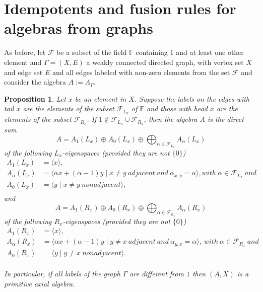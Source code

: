 \documentclass[oneside,a4paper]{amsart} %
\newtheorem{proposition}{Proposition}[section]
\theoremstyle{definition}
\begin{document}



\section{Idempotents and fusion rules for algebras from graphs}
\label{section:axial}

As before, let $\mathcal{F}$ be a subset of the field $\mathbb{F}$ containing  $1$ and at least one other element 
and $\Gamma=(X,E)$  a weakly connected directed graph, with vertex set $X$ and edge set $E$ and all edges  labeled
with non-zero elements from the set $\mathcal{F}$ and consider the algebra  $A:=A_{\Gamma}$.



\begin{proposition}\label{axialprop}
Let $x$ be an element in $X$. Suppose the labels on  the edges with tail  $x$ are the elements of the subset $\mathcal{F}_{L_a}$
of $\mathbb{F}$  and those with head $x$ are the elements of the subset $\mathcal{F}_{R_x}$. 
If $1\not \in \mathcal{F}_{L_a}\cup \mathcal{F}_{R_a}$, then the algebra $A$ is the direct sum 
$$A=A_1(L_x)\oplus A_0(L_x)\oplus \bigoplus_{\alpha\in \mathcal{F}_{L_x}} A_{\alpha}(L_x)$$ of the following   $L_x$-eigenspaces (provided they are not $\{0\}$)
$$
\begin{array}{ll}
A_{1}(L_x)&=\langle x\rangle,\\
A_{\alpha}(L_x)&=\langle \alpha x+ (\alpha-1)y\mid x\neq y\ \mathit{adjacent}\ \mathit{and}\ \alpha_{x,y}=\alpha\rangle, \mathit{with}\ \alpha\in \mathcal{F}_{L_x}\  \mathit{and}\\
A_{0}(L_x)&=\langle y\mid x\neq y\ \mathit{nonadjacent}\rangle,\\

\end{array}$$
and $$A=A_1(R_x)\oplus A_0(R_x)\oplus \bigoplus_{\alpha\in \mathcal{F}_{R_x}} A_{\alpha}(R_x)$$ of the following   $R_x$-eigenspaces (provided they are not $\{0\}$)
$$
\begin{array}{ll}
A_{1}(R_x)&=\langle x\rangle,\\
A_{\alpha}(R_x)&=\langle \alpha x+ (\alpha-1)y\mid y\neq x\ \mathit{adjacent}\ \mathit{and}\ \alpha_{y,x}=\alpha\rangle, \ \mathit{with}\ \alpha\in \mathcal{F}_{R_x}\ \mathit{and}\\
A_{0}(R_x)&=\langle y\mid y\neq x\ \mathit{nonadjacent}\rangle.\\

\end{array}$$


In particular, if all labels of the graph $\Gamma$ are different from $1$ then  $(A,X)$ is a primitive axial algebra. 
\end{proposition}
\end{document}
